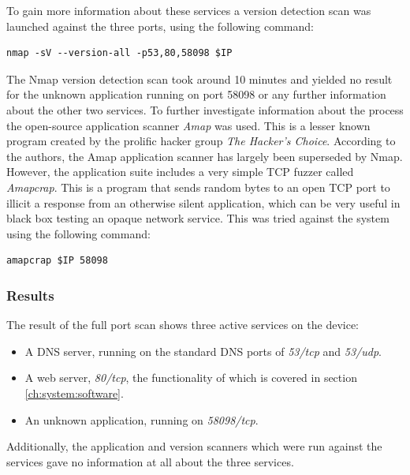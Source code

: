 To gain more information about these services a version detection scan was launched against the three ports, using the following command:
\begin{lstlisting}[frame=tb]
    nmap -sV --version-all -p53,80,58098 $IP
\end{lstlisting}
The Nmap version detection scan took around 10 minutes and yielded no result for the unknown application running on port 58098 or any further information about the other two services. To further investigate information about the process the open-source application scanner \textit{Amap} was used. This is a lesser known program created by the prolific hacker group \textit{The Hacker's Choice}. According to the authors, the Amap application scanner has largely been superseded by Nmap. However, the application suite includes a very simple TCP fuzzer called \textit{Amapcrap}. This is a program that sends random bytes to an open TCP port to illicit a response from an otherwise silent application, which can be very useful in black box testing an opaque network service. This was tried against the system using the following command:
\begin{lstlisting}[frame=tb]
    amapcrap $IP 58098
\end{lstlisting}

\subsubsection{Results}
The result of the full port scan shows three active services on the device:
\begin{itemize}
    \item A DNS server, running on the standard DNS ports of \textit{53/tcp} and \textit{53/udp}.
    \item A web server, \textit{80/tcp}, the functionality of which is covered in section \ref{ch:system:software}.
    \item An unknown application, running on \textit{58098/tcp}.
\end{itemize}
Additionally, the application and version scanners which were run against the services gave no information at all about the three services.

